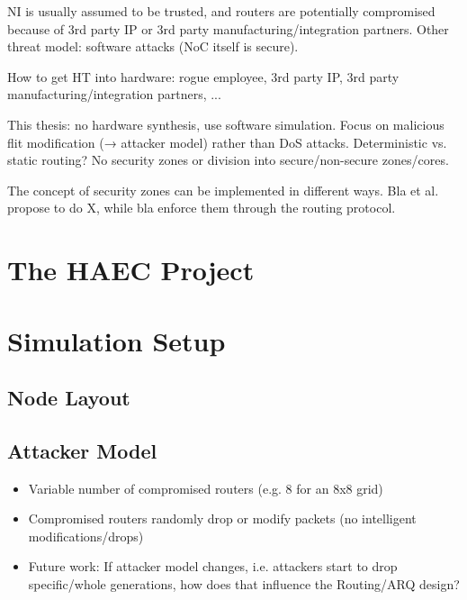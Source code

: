 \documentclass[
	paper=a4,
	fontsize=11pt,
	parskip=full %
]{scrreprt}
\begin{document}
    NI is usually assumed to be trusted, and routers are potentially compromised because of 3rd party IP or 3rd party manufacturing/integration
    partners. Other threat model: software attacks (NoC itself is secure).

    How to get HT into hardware: rogue employee, 3rd party IP, 3rd party manufacturing/integration partners, ...

    This thesis: no hardware synthesis, use software simulation. Focus on malicious flit modification (→ attacker model) rather than DoS attacks.
    Deterministic vs. static routing? No security zones or division into secure/non-secure zones/cores.
    
    The concept of security zones can be implemented in different ways. Bla et al. propose to do X, while bla enforce them through the routing protocol.

    \chapter{The HAEC Project}

    \chapter{Simulation Setup}
    \section{Node Layout}

    \section{Attacker Model}
    \begin{itemize}
        \item Variable number of compromised routers (e.g. 8 for an 8x8 grid)
        \item Compromised routers randomly drop or modify packets (no intelligent modifications/drops)
        \item Future work: If attacker model changes, i.e. attackers start to drop specific/whole generations,
            how does that influence the Routing/ARQ design?
    \end{itemize}
\end{document}
